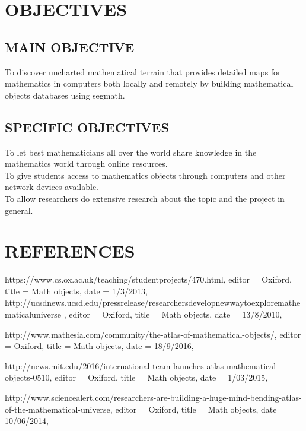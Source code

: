 \documentclass{article}
\begin{document}
\section{OBJECTIVES}

\subsection{MAIN OBJECTIVE}
To discover uncharted mathematical terrain that provides detailed maps for mathematics in computers both locally and remotely by building mathematical objects databases using segmath.\\

\subsection{SPECIFIC OBJECTIVES}
To let best mathematicians all over the world share knowledge in the mathematics world through online resources.\\ 
To give students access to mathematics objects through computers and other network devices available.\\
To allow researchers do extensive research about the topic and the project in general.\\
\cleardoublepage

\section{REFERENCES}\label{sec:intro}
{{https://www.cs.ox.ac.uk/teaching/studentprojects/470.html},
	editor = {Oxiford},
	title = {Math objects},
	date = {1/3/2013},
}
{{http://ucsdnews.ucsd.edu/pressrelease/researchersdevelopnewwaytoexploremathematicaluniverse}		,
	editor = {Oxiford},
	title = {Math objects},
	date = {13/8/2010},
}

{{http://www.mathesia.com/community/the-atlas-of-mathematical-objects/},
	editor = {Oxiford},
	title = {Math objects},
	date = {18/9/2016},
}

{{http://news.mit.edu/2016/international-team-launches-atlas-mathematical-objects-0510},
	editor = {Oxiford},
	title = {Math objects},
	date = {1/03/2015},
}

{{http://www.sciencealert.com/researchers-are-building-a-huge-mind-bending-atlas-of-the-mathematical-universe},
	editor = {Oxiford},
	title = {Math objects},
	date = {10/06/2014},
}

 
\end{document}
